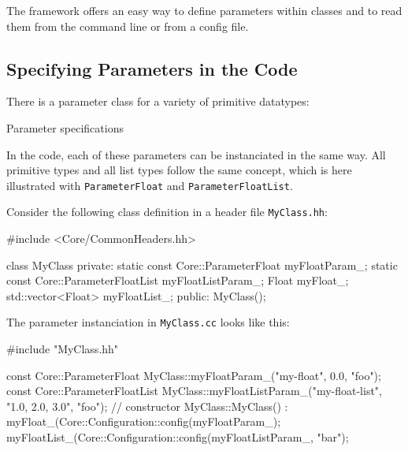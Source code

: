 The framework offers an easy way to define parameters within classes and to read them from the command line or from a config file.

\subsection{Specifying Parameters in the Code}

There is a parameter class for a variety of primitive datatypes:

\begin{fdoc}[0.3]{Parameter specifications}
\end{fdoc}

In the code, each of these parameters can be instanciated in the same way. All primitive types and all list types follow the same concept, which is here illustrated with \texttt{ParameterFloat} and \texttt{ParameterFloatList}.

Consider the following class definition in a header file \texttt{MyClass.hh}:
\begin{code}
#include <Core/CommonHeaders.hh>

class MyClass {
private:
    static const Core::ParameterFloat myFloatParam_;
    static const Core::ParameterFloatList myFloatListParam_;
    Float myFloat_;
    std::vector<Float> myFloatList_;
public:
    MyClass();
}
\end{code}

The parameter instanciation in \texttt{MyClass.cc} looks like this:
\begin{code}
#include "MyClass.hh"

const Core::ParameterFloat MyClass::myFloatParam_("my-float", 0.0, "foo");
const Core::ParameterFloatList MyClass::myFloatListParam_("my-float-list",
                                                  "1.0, 2.0, 3.0", "foo");
// constructor
MyClass::MyClass() :
    myFloat_(Core::Configuration::config(myFloatParam_);
    myFloatList_(Core::Configuration::config(myFloatListParam_, "bar");
{}
\end{code}

